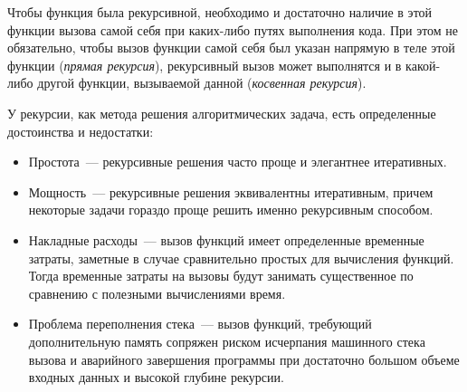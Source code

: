 Чтобы функция была рекурсивной, необходимо и достаточно наличие в этой функции вызова самой себя при каких-либо путях выполнения кода. При этом
не обязательно, чтобы вызов функции самой себя был указан напрямую в теле этой функции (\textit{прямая рекурсия}), рекурсивный вызов может
выполнятся и в какой-либо другой функции, вызываемой данной (\textit{косвенная рекурсия}).

У рекурсии, как метода решения алгоритмических задача, есть определенные достоинства и недостатки:
\begin{itemize}
  \item Простота~--- рекурсивные решения часто проще и элегантнее итеративных.
  \item Мощность~--- рекурсивные решения эквивалентны итеративным, причем некоторые задачи гораздо проще решить
        именно рекурсивным способом.
  \item Накладные расходы~--- вызов функций имеет определенные временные затраты, заметные в случае сравнительно
        простых для вычисления функций. Тогда временные затраты на вызовы будут занимать существенное по сравнению с
        полезными вычислениями время.
  \item Проблема переполнения стека~--- вызов функций, требующий дополнительную память сопряжен риском исчерпания машинного стека
        вызова и аварийного завершения программы при достаточно большом объеме входных данных и высокой глубине рекурсии.
\end{itemize}

